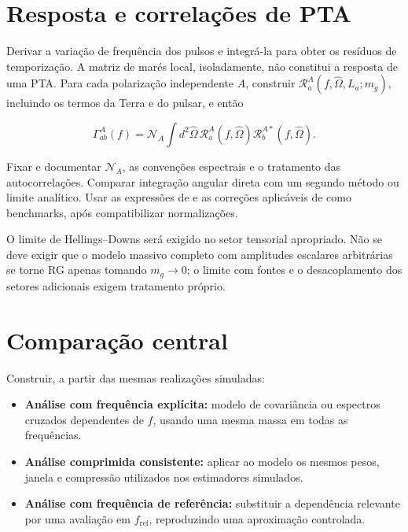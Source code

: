 \section{Resposta e correlações de
PTA}\label{resposta-e-correlauxe7uxf5es-de-pta}

Derivar a variação de frequência dos pulsos e integrá-la para obter os
resíduos de temporização. A matriz de marés local, isoladamente, não
constitui a resposta de uma PTA. Para cada polarização independente
\(A\), construir \(\mathcal R_a^A(f,\hat\Omega,L_a;m_g)\), incluindo os
termos da Terra e do pulsar, e então

\[\Gamma_{ab}^{A}(f)=\mathcal N_A\int d^2\hat\Omega\,
\mathcal R_a^{A}(f,\hat\Omega)\mathcal R_b^{A*}(f,\hat\Omega).\]

Fixar e documentar \(\mathcal N_A\), as convenções espectrais e o
tratamento das autocorrelações. Comparar integração angular direta com
um segundo método ou limite analítico. Usar as expressões de
\textcite{liang2021} e as correções aplicáveis de \textcite{cordes2025}
como benchmarks, após compatibilizar normalizações.

O limite de Hellings--Downs será exigido no setor tensorial apropriado.
Não se deve exigir que o modelo massivo completo com amplitudes
escalares arbitrárias se torne RG apenas tomando \(m_g\to0\); o limite
com fontes e o desacoplamento dos setores adicionais exigem tratamento
próprio.

\section{Comparação central}\label{comparauxe7uxe3o-central}

Construir, a partir das mesmas realizações simuladas:

\begin{itemize}
\tightlist
\item
  \textbf{Análise com frequência explícita:} modelo de covariância ou
  espectros cruzados dependentes de \(f\), usando uma mesma massa em
  todas as frequências.
\item
  \textbf{Análise comprimida consistente:} aplicar ao modelo os mesmos
  pesos, janela e compressão utilizados nos estimadores simulados.
\item
  \textbf{Análise com frequência de referência:} substituir a
  dependência relevante por uma avaliação em \(f_{\mathrm{ref}}\),
  reproduzindo uma aproximação controlada.
\end{itemize}

